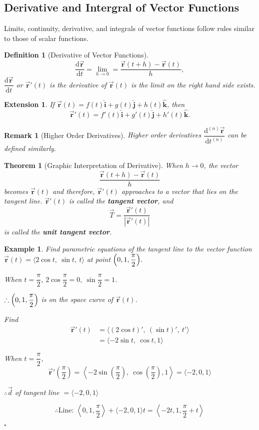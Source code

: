 \documentclass[12pt,a4paper]{article}
\newtheorem{thm}{Theorem}[subsection]
\newtheorem{df}{Definition}[subsection]
\newtheorem{eg}{Example}[subsection]
\newenvironment*{ans}{\par\indent{\textit{Answer. }}\par}{\par\hfill{$\square$}\par}
\newtheorem*{rmk}{\indent Remark}
\newtheorem*{ext}{\indent Extension}
\def\d{{\mathrm{d}}}
\def\vecd{\vec{d}}
\def\vecr{\vec{\boldsymbol{\textbf{r}}}}
\def\veci{\hat{\boldsymbol{\textbf{i}}}}
\def\vecj{\hat{\boldsymbol{\textbf{j}}}}
\def\veck{\hat{\boldsymbol{\textbf{k}}}}
\begin{document}
\subsection{Derivative and Intergral of Vector Functions}
Limits, continuity, derivative, and integrals of vector functions follow rules similar to those of scalar functions.
\begin{df}[Derivative of Vector Functions]
	\[\frac{\d\vecr}{\d t}=\lim_{h\to0}=\frac{\vecr(t+h)-\vecr(t)}{h},\] $\dfrac{\d\vecr}{\d t}$ or $\vecr'(t)$ is the derivative of $\vecr(t)$ is the limit on the right hand side exists. 
\end{df}
\begin{ext}
	If $\vecr(t)=f(t)\veci+g(t)\vecj+h(t)\veck$, then\[\vecr'(t)=f'(t)\veci+g'(t)\vecj+h'(t)\veck.\]	
\end{ext}
\begin{rmk}[Higher Order Derivatives]
	Higher order derivatives $\dfrac{\d^{(n)}\vecr}{\d t^{(n)}}$ can be defined similarly. 	
\end{rmk}
\begin{thm}[Graphic Interpretation of Derivative]
	When $h\to0$, the vector \[\dfrac{\vecr(t+h)-\vecr(t)}{h}\] becomes $\vecr(t)$ and therefore, $\vecr'(t)$ approaches to a vector that lies on the tangent line. $\vecr'(t)$ is called the \textbf{tangent vector}, and \[\vec{T}=\dfrac{\vecr'(t)}{|\vecr'(t)|}\] is called the \textbf{unit tangent vector}.
\end{thm}
\begin{eg}
	Find parametric equations of the tangent line to the vector function $\vecr(t)=\langle2\cos{t},\ \sin{t},\ t\rangle$ at point $\qty(0,1,\dfrac{\pi}{2}).$
	\begin{ans}
		When $t=\dfrac{\pi}{2}$, $2\cos{\dfrac{\pi}{2}}=0,\ \sin{\dfrac{\pi}{2}}=1$.\par $\therefore\qty(0,1,\dfrac{\pi}{2})$ is on the space curve of $\vecr(t)$.\par Find \[\begin{aligned}\vecr'(t)&=\langle(2\cos{t})',\ (\sin{t})',\ t'\rangle\\&=\langle-2\sin{t},\ \cos{t}, 1\rangle\end{aligned}\]	\par When $t=\dfrac{\pi}{2}$, \[\vecr'\left(\frac{\pi}{2}\right)=\left\langle-2\sin{\left(\frac{\pi}{2}\right)},\ \cos{\left(\frac{\pi}{2}\right)}, 1\right\rangle=\langle-2,0,1\rangle\]\par $\therefore \vecd$ of tangent line $=\langle-2,0,1\rangle$\par \[\therefore\text{Line: }\left\langle0,1,\frac{\pi}{2}\right\rangle+\langle-2,0,1\rangle t=\left\langle-2t,1,\frac{\pi}{2}+t\right\rangle\]
	\end{ans}	
\end{eg}
\end{document}
